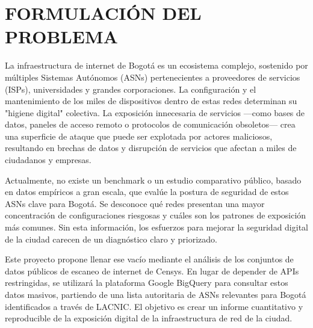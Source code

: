 \section{FORMULACIÓN DEL PROBLEMA}

La infraestructura de internet de Bogotá es un ecosistema complejo, sostenido por múltiples Sistemas Autónomos (ASNs) pertenecientes a proveedores de servicios (ISPs), universidades y grandes corporaciones. La configuración y el mantenimiento de los miles de dispositivos dentro de estas redes determinan su "higiene digital" colectiva. La exposición innecesaria de servicios —como bases de datos, paneles de acceso remoto o protocolos de comunicación obsoletos— crea una superficie de ataque que puede ser explotada por actores maliciosos, resultando en brechas de datos y disrupción de servicios que afectan a miles de ciudadanos y empresas.

Actualmente, no existe un benchmark o un estudio comparativo público, basado en datos empíricos a gran escala, que evalúe la postura de seguridad de estos ASNs clave para Bogotá. Se desconoce qué redes presentan una mayor concentración de configuraciones riesgosas y cuáles son los patrones de exposición más comunes. Sin esta información, los esfuerzos para mejorar la seguridad digital de la ciudad carecen de un diagnóstico claro y priorizado.

Este proyecto propone llenar ese vacío mediante el análisis de los conjuntos de datos públicos de escaneo de internet de Censys. En lugar de depender de APIs restringidas, se utilizará la plataforma Google BigQuery para consultar estos datos masivos, partiendo de una lista autoritaria de ASNs relevantes para Bogotá identificados a través de LACNIC. El objetivo es crear un informe cuantitativo y reproducible de la exposición digital de la infraestructura de red de la ciudad.